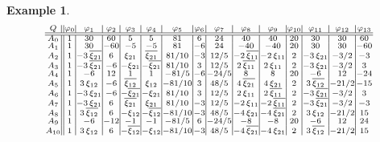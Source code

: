 \documentclass[11pt]{amsart}
\theoremstyle{plain} %
\theoremstyle{definition} %
\newtheorem{ex}[thm]{Example} %
\theoremstyle{remark} %
\begin{document}
\begin{ex}
\begin{table}[h]
\[
\scriptsize
\setlength{\tabcolsep}{0.7pt}
\renewcommand{\arraystretch}{0.8}
\begin{tabular}{c||c|c|c|c|c|c|c|c|c|c|c|c|c|c}
$Q$ & $\varphi_0$ & $\varphi_1$ & $\varphi_2$ & $\varphi_3$ & $\varphi_4$ & $\varphi_5$ & $\varphi_6$ & $\varphi_7$ & $\varphi_8$ & $\varphi_9$ & $\varphi_{10}$ & $\varphi_{11}$ & $\varphi_{12}$ & $\varphi_{13}$ \\ \hline\hline
$A_0$  & $1$ & $30$ & $60$ & $5$ & $5$ & $81$ & $6$ & $24$ & $40$ & $40$ & $20$ & $30$ & $30$ & $60$ \\
$A_1$  & $1$ & $30$ & $-60$ & $-5$ & $-5$ & $81$ & $-6$ & $24$ & $-40$ & $-40$ & $20$ & $30$ & $30$ & $-60$ \\
$A_2$  & $1$ & $-3\,\overline{\xi_{21}}$ & $6$ & $\xi_{21}$ & $\overline{\xi_{21}}$ & $81/10$ & $-3$ & $12/5$ & $-2\,\overline{\xi_{11}}$ & $-2\,\xi_{11}$ & $2$ & $-3\,\xi_{21}$ & $-3/2$ & $-3$ \\
$A_3$  & $1$ & $-3\,\overline{\xi_{21}}$ & $-6$ & $-\xi_{21}$ & $-\overline{\xi_{21}}$ & $81/10$ & $3$ & $12/5$ & $2\,\overline{\xi_{11}}$ & $2\,\xi_{11}$ & $2$ & $-3\,\xi_{21}$ & $-3/2$ & $3$ \\
$A_4$  & $1$ & $-6$ & $12$ & $1$ & $1$ & $-81/5$ & $-6$ & $-24/5$ & $8$ & $8$ & $20$ & $-6$ & $12$ & $-24$ \\
$A_5$  & $1$ & $3\,\xi_{12}$ & $-6$ & $\overline{\xi_{12}}$ & $\xi_{12}$ & $-81/10$ & $3$ & $48/5$ & $4\,\overline{\xi_{21}}$ & $4\,\xi_{21}$ & $2$ & $3\,\overline{\xi_{12}}$ & $-21/2$ & $-15$ \\
$A_6$  & $1$ & $-3\,\xi_{21}$ & $-6$ & $-\overline{\xi_{21}}$ & $-\xi_{21}$ & $81/10$ & $3$ & $12/5$ & $2\,\xi_{11}$ & $2\,\overline{\xi_{11}}$ & $2$ & $-3\,\overline{\xi_{21}}$ & $-3/2$ & $3$ \\
$A_7$  & $1$ & $-3\,\xi_{21}$ & $6$ & $\overline{\xi_{21}}$ & $\xi_{21}$ & $81/10$ & $-3$ & $12/5$ & $-2\,\xi_{11}$ & $-2\,\overline{\xi_{11}}$ & $2$ & $-3\,\overline{\xi_{21}}$ & $-3/2$ & $-3$ \\
$A_8$  & $1$ & $3\,\overline{\xi_{12}}$ & $6$ & $-\xi_{12}$ & $-\overline{\xi_{12}}$ & $-81/10$ & $-3$ & $48/5$ & $-4\,\xi_{21}$ & $-4\,\overline{\xi_{21}}$ & $2$ & $3\,\xi_{12}$ & $-21/2$ & $15$ \\
$A_9$  & $1$ & $-6$ & $-12$ & $-1$ & $-1$ & $-81/5$ & $6$ & $-24/5$ & $-8$ & $-8$ & $20$ & $-6$ & $12$ & $24$ \\
$A_{10}$& $1$ & $3\,\xi_{12}$ & $6$ & $-\overline{\xi_{12}}$ & $-\xi_{12}$ & $-81/10$ & $-3$ & $48/5$ & $-4\,\overline{\xi_{21}}$ & $-4\,\xi_{21}$ & $2$ & $3\,\overline{\xi_{12}}$ & $-21/2$ & $15$ \\

\end{tabular}\]
\end{table}
\end{ex}
\end{document}
